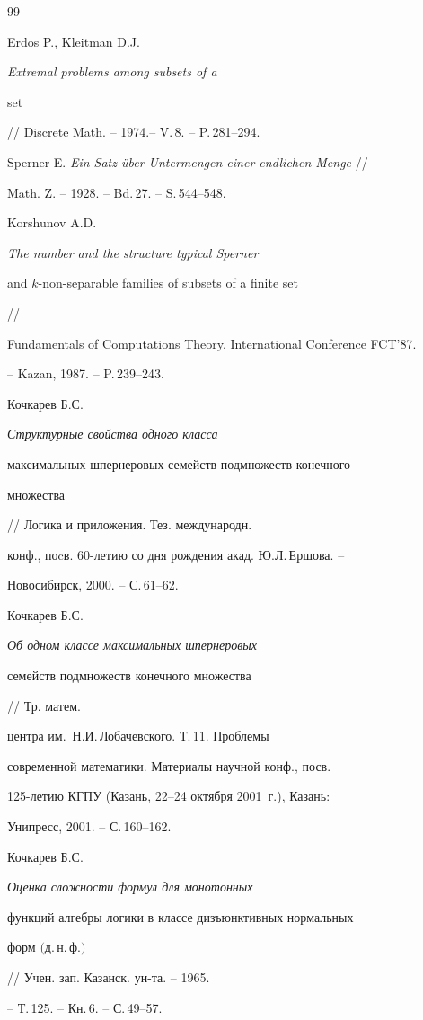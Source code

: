 \begin{thebibliography}{99} 


 




Erdos P., Kleitman D.J. {\em Extremal problems among subsets of a 


set} // Discrete Math. -- 1974.-- V.\,8. -- P.\,281--294. 




Sperner E. {\em Ein Satz \"uber Untermengen einer endlichen Menge} // 


Math. Z. -- 1928. -- Bd.\,27. -- S.\,544--548. 




Korshunov A.D. {\em The number and the structure typical Sperner 


and $k$-non-separable families of subsets of a finite set} // 


Fundamentals of Computations Theory. International Conference FCT'87. 


-- Kazan, 1987. -- P.\,239--243. 




Кочкарев Б.С. {\em Структурные свойства одного класса 


максимальных шпернеровых семейств подмножеств конечного 


множества} // Логика и приложения. Тез. международн. 


конф., поcв. 60-летию со дня рождения акад. Ю.Л.\,Ершова. -- 


Новосибирск, 2000. -- С.\,61--62. 




Кочкарев Б.С. {\em Об одном классе максимальных шпернеровых 


семейств подмножеств конечного множества} // Тр. матем. 


центра им.~Н.И.\,Лобачевского. Т.\,11. Проблемы 


современной математики. Материалы научной конф., посв. 


125-летию КГПУ (Казань, 22--24 октября 2001~г.), Казань: 


Унипресс, 2001. -- С.\,160--162. 




Кочкарев Б.С. {\em Оценка сложности формул для монотонных 


функций алгебры логики в классе дизъюнктивных нормальных 


форм $($д.\,н.\,ф.$)$} // Учен. зап. Казанск. ун-та. -- 1965. 


-- Т.\,125. -- Кн.\,6. -- С.\,49--57. 


 


\end{thebibliography} 


 


\vskip 2cm 


 






 


\label{end} 


 


